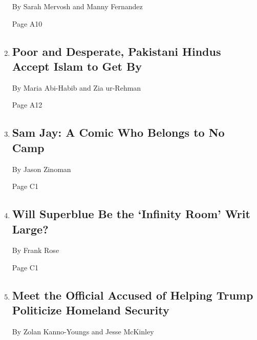 \begin{enumerate}
  By Sarah Mervosh and Manny Fernandez

  Page A10
\item
  \href{/2020/08/04/world/asia/pakistan-hindu-conversion.html}{}

  \hypertarget{poor-and-desperate-pakistani-hindus-accept-islam-to-get-by}{%
  \subsection{Poor and Desperate, Pakistani Hindus Accept Islam to Get
  By}\label{poor-and-desperate-pakistani-hindus-accept-islam-to-get-by}}

  By Maria Abi-Habib and Zia ur-Rehman

  Page A12
\item
  \href{/2020/08/04/arts/television/sam-jay-netflix-special.html}{}

  \hypertarget{sam-jay-a-comic-who-belongs-to-no-camp}{%
  \subsection{Sam Jay: A Comic Who Belongs to No
  Camp}\label{sam-jay-a-comic-who-belongs-to-no-camp}}

  By Jason Zinoman

  Page C1
\item
  \href{/2020/08/04/arts/superblue-immersive-art-pace-jobs.html}{}

  \hypertarget{will-superblue-be-the-infinity-room-writ-large}{%
  \subsection{Will Superblue Be the `Infinity Room' Writ
  Large?}\label{will-superblue-be-the-infinity-room-writ-large}}

  By Frank Rose

  Page C1
\item
  \href{/2020/08/04/us/politics/trump-homeland-security.html}{}

  \hypertarget{meet-the-official-accused-of-helping-trump-politicize-homeland-security}{%
  \subsection{Meet the Official Accused of Helping Trump Politicize
  Homeland
  Security}\label{meet-the-official-accused-of-helping-trump-politicize-homeland-security}}

  By Zolan Kanno-Youngs and Jesse McKinley


\end{enumerate}
